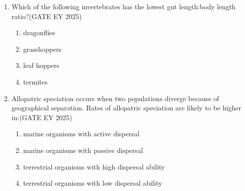 \begin{enumerate}[leftmargin=*,label=\textbf{Q.\arabic*}]
\item Which of the following invertebrates has the lowest gut length:body length ratio?\hfill {(GATE EY 2025)}
\begin{multicols}{2}
\begin{enumerate}
\item dragonflies
\item grasshoppers
\item leaf hoppers
\item termites
\end{enumerate}
\end{multicols}

\item Allopatric speciation occurs when two populations diverge because of geographical separation. Rates of allopatric speciation are likely to be higher in:\hfill {(GATE EY 2025)}

\begin{enumerate}
\item marine organisms with active dispersal
\item marine organisms with passive dispersal
\item terrestrial organisms with high dispersal ability
\item terrestrial organisms with low dispersal ability
\end{enumerate}

\end{enumerate}
